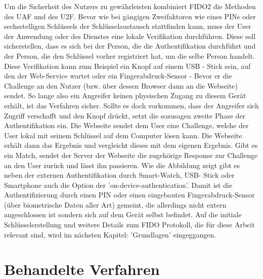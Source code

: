 Um die Sicherheit des Nutzers zu gewährleisten kombiniert FIDO2 die Methoden des UAF und des U2F. Bevor wie bei gängigen Zweifaktoren wie eines PINs oder sechsstelligen Schlüssels der Schlüsselaustausch stattfinden kann, muss der User der Anwendung oder des Dienstes eine lokale Verifikation durchführen. Diese soll sicherstellen, dass es sich bei der Person, die die Authentifikation durchführt und der Person, die den Schlüssel vorher registriert hat, um die selbe Person handelt. Diese Verifikation kann zum Beispiel ein Knopf auf einem USB - Stick sein, auf den der Web-Service wartet oder ein Fingerabdruck-Sensor - Bevor er die Challenge an den Nutzer (bzw. über dessen Browser dann an die Webseite) sendet. So lange also ein Angreifer keinen physischen Zugang zu diesem Gerät erhält, ist das Verfahren sicher. Sollte es doch vorkommen, dass der Angreifer sich Zugriff verschafft und den Knopf drückt, setzt die sozusagen zweite Phase der Authentifikation ein. Die Webseite sendet dem User eine Challenge, welche der User lokal mit seinem Schlüssel auf dem Computer lösen kann. Die Webseite erhält dann das Ergebnis und vergleicht dieses mit dem eigenen Ergebnis. Gibt es ein Match, sendet der Server der Webseite die zugehörige Response zur Challenge an den User zurück und lässt ihn passieren. Wie die Abbildung zeigt gibt es neben der externen Authentifikation durch Smart-Watch, USB- Stick oder Smartphone auch die Option der 'on-device-authentication'. Damit ist die Authentifizierung durch einen PIN oder einen eingebauten Fingerabdruck-Sensor (über biometrische Daten aller Art) gemeint, die allerdings nicht extern angeschlossen ist sondern sich auf dem Gerät selbst befindet. Auf die initiale Schlüsselerstellung und weitere Details zum FIDO Protokoll, die für diese Arbeit relevant sind, wird im nächsten Kapitel: 'Grundlagen' eingeggangen.

\section{Behandelte Verfahren}
